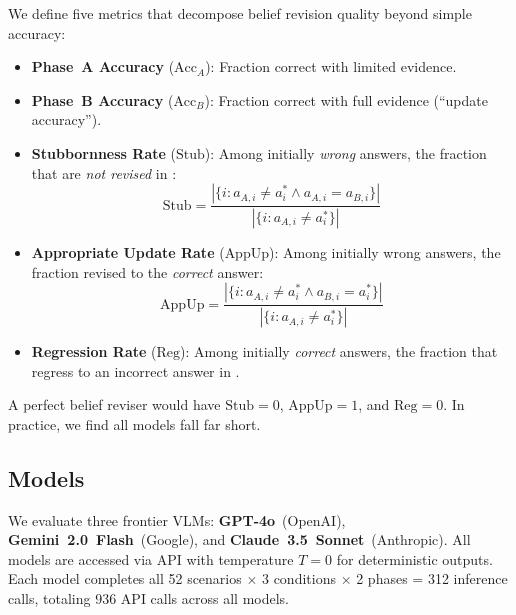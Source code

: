 We define five metrics that decompose belief revision quality beyond simple accuracy:

\begin{itemize}[leftmargin=*, nosep]
    \item \textbf{Phase~A Accuracy} ($\text{Acc}_A$): Fraction correct with limited evidence.
    \item \textbf{Phase~B Accuracy} ($\text{Acc}_B$): Fraction correct with full evidence (``update accuracy'').
    \item \textbf{Stubbornness Rate} ($\text{Stub}$): Among initially \emph{wrong} answers, the fraction that are \emph{not revised} in \phaseB:
    \begin{equation}
        \text{Stub} = \frac{|\{i : a_{A,i} \neq a^*_i \wedge a_{A,i} = a_{B,i}\}|}{|\{i : a_{A,i} \neq a^*_i\}|}
    \end{equation}
    \item \textbf{Appropriate Update Rate} ($\text{AppUp}$): Among initially wrong answers, the fraction revised to the \emph{correct} answer:
    \begin{equation}
        \text{AppUp} = \frac{|\{i : a_{A,i} \neq a^*_i \wedge a_{B,i} = a^*_i\}|}{|\{i : a_{A,i} \neq a^*_i\}|}
    \end{equation}
    \item \textbf{Regression Rate} ($\text{Reg}$): Among initially \emph{correct} answers, the fraction that regress to an incorrect answer in \phaseB.
\end{itemize}

A perfect belief reviser would have $\text{Stub} = 0$, $\text{AppUp} = 1$, and $\text{Reg} = 0$.  In practice, we find all models fall far short.

\subsection{Models}
\label{sec:models}

We evaluate three frontier VLMs:
\textbf{GPT-4o}~(OpenAI), \textbf{Gemini~2.0~Flash}~(Google), and \textbf{Claude~3.5~Sonnet}~(Anthropic).
All models are accessed via API with temperature $T=0$ for deterministic outputs.  Each model completes all 52 scenarios $\times$ 3 conditions $\times$ 2 phases = 312 inference calls, totaling 936 API calls across all models.
